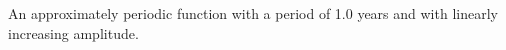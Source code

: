 An approximately periodic function with a period of 1.0 years and with linearly increasing amplitude.